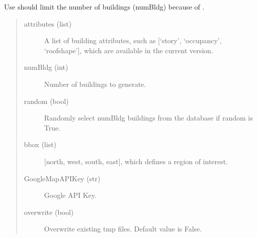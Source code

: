 \documentclass[letterpaper,10pt,english]{sphinxmanual}
\begin{document}
\sphinxAtStartPar
Use should limit the number of buildings (numBldg) because of {\hyperref[\detokenize{common/user_manual/workflow:limitthenumber}]{}}.
\begin{quote}

\begin{sphinxVerbatim}[commandchars=\\\{\}]
   

  \PYG{p}{[}\PYG{p}{]}
                \PYG{p}{[}  \PYG{p}{]}

  
\end{sphinxVerbatim}
\end{quote}
\begin{quote}\begin{description}
\item[{attributes (list)}] \leavevmode
\sphinxAtStartPar
A list of building attributes, such as {[}‘story’, ‘occupancy’, ‘roofshape’{]}, which are available in the current version.

\item[{numBldg (int)}] \leavevmode
\sphinxAtStartPar
Number of buildings to generate.

\item[{random (bool)}] \leavevmode
\sphinxAtStartPar
Randomly select numBldg buildings from the database if random is True.

\item[{bbox (list)}] \leavevmode
\sphinxAtStartPar
{[}north, west, south, east{]}, which defines a region of interest.

\item[{GoogleMapAPIKey (str)}] \leavevmode
\sphinxAtStartPar
Google API Key.

\item[{overwrite (bool)}] \leavevmode
\sphinxAtStartPar
Overwrite existing tmp files. Default value is False.

\end{description}\end{quote}
\end{document}
